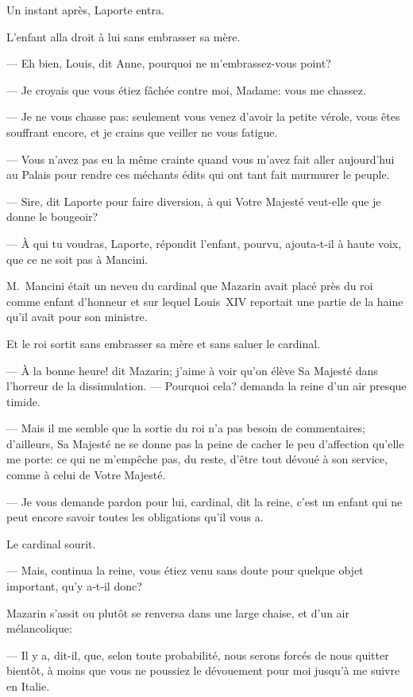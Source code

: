 Un instant après, Laporte entra.

L'enfant alla droit à lui sans embrasser sa mère.

— Eh bien, Louis, dit Anne, pourquoi ne m'embrassez-vous point?

— Je croyais que vous étiez fâchée contre moi, Madame: vous me chassez.

— Je ne vous chasse pas: seulement vous venez d'avoir la petite vérole, vous êtes souffrant encore, et je crains que veiller ne vous fatigue.

— Vous n'avez pas eu la même crainte quand vous m'avez fait aller aujourd'hui au Palais pour rendre ces méchants édits qui ont tant fait murmurer le peuple.

— Sire, dit Laporte pour faire diversion, à qui Votre Majesté veut-elle que je donne le bougeoir?

— À qui tu voudras, Laporte, répondit l'enfant, pourvu, ajouta-t-il à haute voix, que ce ne soit pas à Mancini.

M.~Mancini était un neveu du cardinal que Mazarin avait placé près du roi comme enfant d'honneur et sur lequel Louis~XIV reportait une partie de la haine qu'il avait pour son ministre.

Et le roi sortit sans embrasser sa mère et sans saluer le cardinal.

— À la bonne heure! dit Mazarin; j'aime à voir qu'on élève Sa Majesté dans l'horreur de la dissimulation.
— Pourquoi cela? demanda la reine d'un air presque timide.

— Mais il me semble que la sortie du roi n'a pas besoin de commentaires; d'ailleurs, Sa Majesté ne se donne pas la peine de cacher le peu d'affection qu'elle me porte: ce qui ne m'empêche pas, du reste, d'être tout dévoué à son service, comme à celui de Votre Majesté.

— Je vous demande pardon pour lui, cardinal, dit la reine, c'est un enfant qui ne peut encore savoir toutes les obligations qu'il vous a.

Le cardinal sourit.

— Mais, continua la reine, vous étiez venu sans doute pour quelque objet important, qu'y a-t-il donc?

Mazarin s'assit ou plutôt se renversa dans une large chaise, et d'un air mélancolique:

— Il y a, dit-il, que, selon toute probabilité, nous serons forcés de nous quitter bientôt, à moins que vous ne poussiez le dévouement pour moi jusqu'à me suivre en Italie.

